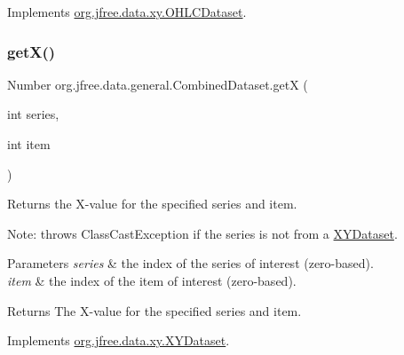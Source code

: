 Implements \mbox{\hyperlink{interfaceorg_1_1jfree_1_1data_1_1xy_1_1_o_h_l_c_dataset_a132a37218de3b54bf308b3dcfb93cf84}{org.\+jfree.\+data.\+xy.\+O\+H\+L\+C\+Dataset}}.

\mbox{\label{classorg_1_1jfree_1_1data_1_1general_1_1_combined_dataset_ac323284fc0d4b04b2e725324c477fbe7}} 
\subsubsection{\texorpdfstring{get\+X()}{getX()}}
{\footnotesize\ttfamily Number org.\+jfree.\+data.\+general.\+Combined\+Dataset.\+getX (\begin{DoxyParamCaption}\item[{int}]{series,  }\item[{int}]{item }\end{DoxyParamCaption})}

Returns the X-\/value for the specified series and item. 

Note\+: throws {\ttfamily Class\+Cast\+Exception} if the series is not from a \mbox{\hyperlink{}{X\+Y\+Dataset}}.


\begin{DoxyParams}{Parameters}
{\em series} & the index of the series of interest (zero-\/based). \\
\hline
{\em item} & the index of the item of interest (zero-\/based).\\
\hline
\end{DoxyParams}
\begin{DoxyReturn}{Returns}
The X-\/value for the specified series and item. 
\end{DoxyReturn}


Implements \mbox{\hyperlink{interfaceorg_1_1jfree_1_1data_1_1xy_1_1_x_y_dataset_a85c75ba5b69b551e96afd29d1732ba22}{org.\+jfree.\+data.\+xy.\+X\+Y\+Dataset}}.

\mbox{\label{classorg_1_1jfree_1_1data_1_1general_1_1_combined_dataset_a87e02aef2783486fbe4be09ae4f1e3bf}} 
